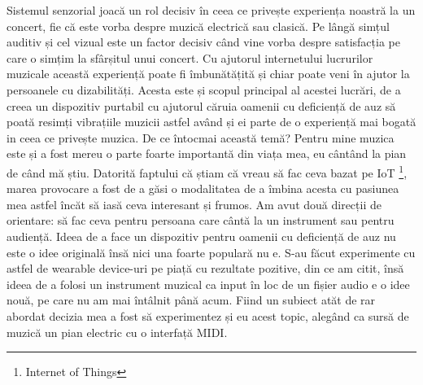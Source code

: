 \documentclass[../IoMusT.tex]{subfiles}
\begin{document}
\par Sistemul senzorial joacă un rol decisiv în ceea ce privește experiența noastră la un concert, fie că este vorba despre muzică electrică sau clasică. Pe lângă simțul auditiv și cel vizual este un factor decisiv când vine vorba despre satisfacția pe care o simțim la sfârșitul unui concert. Cu ajutorul internetului lucrurilor muzicale această experiență poate fi îmbunătățită și chiar poate veni în ajutor la persoanele cu dizabilități. Acesta este și scopul principal al acestei lucrări, de a creea un dispozitiv purtabil cu ajutorul căruia oamenii cu deficiență de auz să poată resimți vibrațiile muzicii astfel având și ei parte de o experiență mai bogată in ceea ce privește muzica. De ce întocmai această temă? Pentru mine mu\-zi\-ca este și a fost mereu o parte foarte importantă din viața mea, eu cântând la pian de când mă știu. Datorită faptului că știam că vreau să fac ceva bazat pe IoT \footnote{Internet of Things}, marea provocare a fost de a găsi o modalitatea de a îmbina acesta cu pasiunea mea astfel încăt să iasă ceva interesant și frumos. Am avut două direcții de orientare: să fac ceva pentru persoana care cântă la un instrument sau pentru audiență. Ideea de a face un dispozitiv pentru oamenii cu deficiență de auz nu este o idee originală însă nici una foarte populară nu e. S-au făcut experimente cu astfel de wearable device-uri pe piață cu rezultate pozitive, din ce am citit, însă ideea de a folosi un instrument muzical ca input în loc de un fișier audio e o idee nouă, pe care nu am mai întâlnit până acum. Fiind un subiect atăt de rar abordat decizia mea a fost să experimentez și eu acest topic, alegând ca sursă de muzică un pian electric cu o interfață MIDI.
\end{document}
